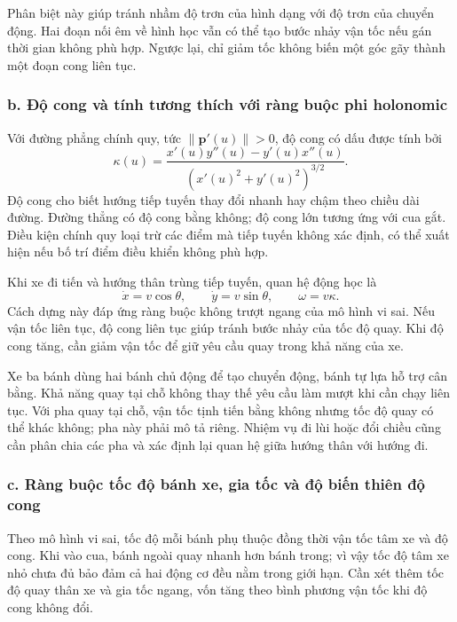 \documentclass[12pt,a4paper,oneside]{report}
\begin{document}
Phân biệt này giúp tránh nhầm độ trơn của hình dạng với độ trơn của chuyển động. Hai đoạn nối êm về hình học vẫn có thể tạo bước nhảy vận tốc nếu gán thời gian không phù hợp. Ngược lại, chỉ giảm tốc không biến một góc gãy thành một đoạn cong liên tục.

\subsubsection*{b. Độ cong và tính tương thích với ràng buộc phi holonomic}

Với đường phẳng chính quy, tức \(\|\mathbf p'(u)\|>0\), độ cong có dấu được tính bởi
\begin{equation}
  \kappa(u)=\frac{x'(u)y''(u)-y'(u)x''(u)}
                   {(x'(u)^2+y'(u)^2)^{3/2}}.
  \label{eq:smooth-curvature}
\end{equation}
Độ cong cho biết hướng tiếp tuyến thay đổi nhanh hay chậm theo chiều dài đường. Đường thẳng có độ cong bằng không; độ cong lớn tương ứng với cua gắt. Điều kiện chính quy loại trừ các điểm mà tiếp tuyến không xác định, có thể xuất hiện nếu bố trí điểm điều khiển không phù hợp.

Khi xe đi tiến và hướng thân trùng tiếp tuyến, quan hệ động học là
\begin{equation}
  \dot x=v\cos\theta,\qquad \dot y=v\sin\theta,\qquad
  \omega=v\kappa.
  \label{eq:smooth-unicycle}
\end{equation}
Cách dựng này đáp ứng ràng buộc không trượt ngang của mô hình vi sai. Nếu vận tốc liên tục, độ cong liên tục giúp tránh bước nhảy của tốc độ quay. Khi độ cong tăng, cần giảm vận tốc để giữ yêu cầu quay trong khả năng của xe.

Xe ba bánh dùng hai bánh chủ động để tạo chuyển động, bánh tự lựa hỗ trợ cân bằng. Khả năng quay tại chỗ không thay thế yêu cầu làm mượt khi cần chạy liên tục. Với pha quay tại chỗ, vận tốc tịnh tiến bằng không nhưng tốc độ quay có thể khác không; pha này phải mô tả riêng. Nhiệm vụ đi lùi hoặc đổi chiều cũng cần phân chia các pha và xác định lại quan hệ giữa hướng thân với hướng đi.

\subsubsection*{c. Ràng buộc tốc độ bánh xe, gia tốc và độ biến thiên độ cong}

Theo mô hình vi sai, tốc độ mỗi bánh phụ thuộc đồng thời vận tốc tâm xe và độ cong. Khi vào cua, bánh ngoài quay nhanh hơn bánh trong; vì vậy tốc độ tâm xe nhỏ chưa đủ bảo đảm cả hai động cơ đều nằm trong giới hạn. Cần xét thêm tốc độ quay thân xe và gia tốc ngang, vốn tăng theo bình phương vận tốc khi độ cong không đổi.
\end{document}
